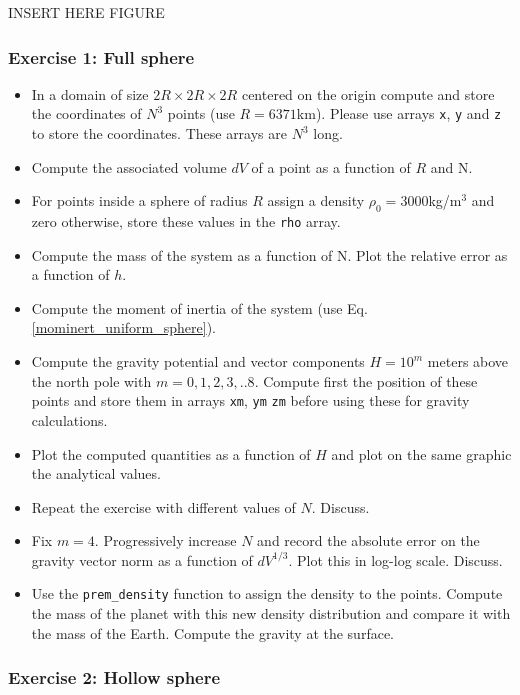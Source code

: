 INSERT HERE FIGURE


\subsubsection*{Exercise 1: Full sphere}

\begin{itemize}
\item In a domain of size $2R\times 2R \times 2R$ centered on the origin compute and store the coordinates 
of $N^3$ points (use $R=6371$km). Please use arrays {\tt x}, {\tt y} and {\tt z} to store the coordinates.
These arrays are $N^3$ long.
\item Compute the associated volume $dV$ of a point as a function of $R$ and N.
\item For points inside a sphere of radius $R$ assign a density $\rho_0=3000$kg/m$^3$ and zero otherwise, store these values in the {\tt rho} array.
\item Compute the mass of the system as a function of N. Plot the relative error as a function of $h$.
\item Compute the moment of inertia of the system (use Eq. \ref{mominert_uniform_sphere}).
\item Compute the gravity potential and vector components $H=10^m$ meters above the north pole 
with $m=0,1,2,3,..8$. Compute first the position of these points and store them 
in arrays {\tt xm}, {\tt ym} {\tt zm} before using these for gravity calculations. 
\item Plot the computed quantities as a function of $H$ and plot on the same graphic the analytical values. 
\item Repeat the exercise with different values of $N$. Discuss.
\item Fix $m=4$. Progressively increase $N$ and record the absolute error on the gravity vector norm 
as a function of $dV^{1/3}$. Plot this in log-log scale. Discuss.
\item Use the {\tt prem\_density} function to assign the density to the points. Compute the mass of the planet with this new density distribution and compare it with the mass of the Earth. Compute the gravity at the surface.
\end{itemize}

\subsubsection*{Exercise 2: Hollow sphere}

